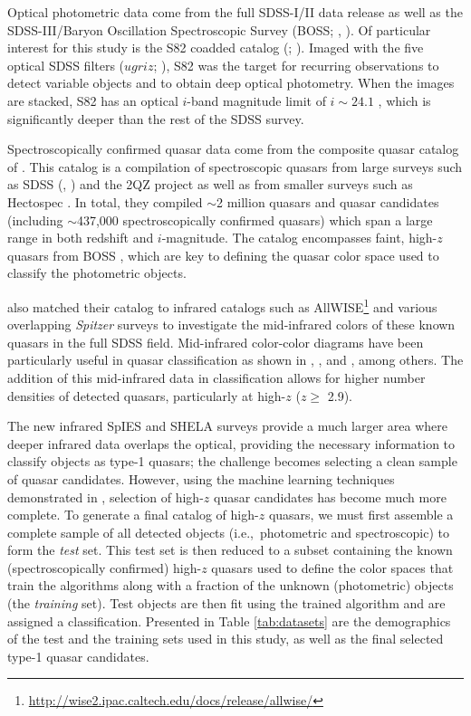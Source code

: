 \documentclass[apj, numberedappendix]{emulateapj}
\begin{document}
Optical photometric data come from the full SDSS-I/II \citep{York2000} data release as well as the SDSS-III/Baryon Oscillation Spectroscopic Survey (BOSS; \citealt{Eisenstein2011}, \citealt{Dawson2013}). Of particular interest for this study is the S82 coadded catalog (\citealt{Annis2014}; \citealt{Jiang2014}). Imaged with the five optical SDSS filters ($ugriz$; \citealt{Fukugita1996}), S82 was the target for recurring observations to detect variable objects and to obtain deep optical photometry. When the images are stacked, S82 has an optical $i$-band magnitude limit of $i \sim 24.1$ \citep{Jiang2014}, which is significantly deeper than the rest of the SDSS survey. 

Spectroscopically confirmed quasar data come from the composite quasar catalog of \citet{Richards2015}. This catalog is a compilation of spectroscopic quasars from large surveys such as SDSS (\citealt{York2000}, \citealt{Eisenstein2011}) and the 2QZ project \citep{Croom2004} as well as from smaller surveys such as Hectospec \citep{Fabricant2005}. In total, they compiled $\sim$2 million quasars and quasar candidates (including $\sim$437,000 spectroscopically confirmed quasars) which span a large range in both redshift and $i$-magnitude. The catalog encompasses faint, high-$z$ quasars from BOSS \citep{Paris2014}, which are key to defining the quasar color space used to classify the photometric objects. 

\citet{Richards2015} also matched their catalog to infrared catalogs such as AllWISE\footnote{\url{http://wise2.ipac.caltech.edu/docs/release/allwise/}} and various overlapping \emph{Spitzer} surveys to investigate the mid-infrared colors of these known quasars in the full SDSS field. Mid-infrared color-color diagrams have been particularly useful in quasar classification as shown in \citet{Lacy2004}, \citet{Stern2005}, and \citet{Donley2012}, among others. The addition of this mid-infrared data in classification allows for higher number densities of detected quasars, particularly at high-$z$ ($z \geq$ 2.9).

The new infrared SpIES and SHELA surveys provide a much larger area where deeper infrared data overlaps the optical, providing the necessary information to classify objects as type-1 quasars; the challenge becomes selecting a clean sample of quasar candidates. However, using the machine learning techniques demonstrated in \citet{Richards2015}, selection of high-$z$ quasar candidates has become much more complete. To generate a final catalog of high-$z$ quasars, we must first assemble a complete sample of all detected objects (i.e.,\ photometric and spectroscopic) to form the \emph{test} set. This test set is then reduced to a subset containing the known (spectroscopically confirmed) high-$z$ quasars used to define the color spaces that train the algorithms along with a fraction of the unknown (photometric) objects (the \emph{training} set). Test objects are then fit using the trained algorithm and are assigned a classification. Presented in Table \ref{tab:datasets} are the demographics of the test and the training sets used in this study, as well as the final selected type-1 quasar candidates.
  
\end{document}
